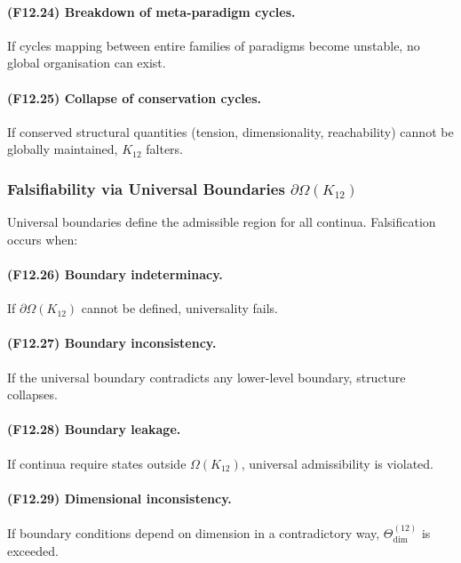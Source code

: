 \paragraph{(F12.24) Breakdown of meta-paradigm cycles.}
If cycles mapping between entire families of paradigms become unstable,
no global organisation can exist.

\paragraph{(F12.25) Collapse of conservation cycles.}
If conserved structural quantities (tension, dimensionality, reachability)
cannot be globally maintained, $K_{12}$ falters.



\subsubsection{Falsifiability via Universal Boundaries $\partial\Omega(K_{12})$}

Universal boundaries define the admissible region for all continua.
Falsification occurs when:

\paragraph{(F12.26) Boundary indeterminacy.}
If $\partial\Omega(K_{12})$ cannot be defined, universality fails.

\paragraph{(F12.27) Boundary inconsistency.}
If the universal boundary contradicts any lower-level boundary,
structure collapses.

\paragraph{(F12.28) Boundary leakage.}
If continua require states outside $\Omega(K_{12})$,  
universal admissibility is violated.

\paragraph{(F12.29) Dimensional inconsistency.}
If boundary conditions depend on dimension in a contradictory way,
$\Theta_{\mathrm{dim}}^{(12)}$ is exceeded.

